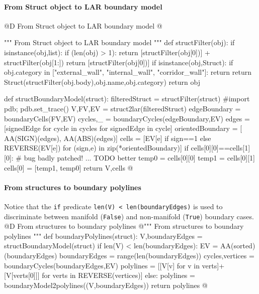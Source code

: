 \documentclass[11pt,oneside]{article}	%
\begin{document}
\paragraph{From Struct object to LAR boundary model}
@D From Struct object to LAR boundary model
@{""" From Struct object to LAR boundary model """
def structFilter(obj):
    if isinstance(obj,list):
        if (len(obj) > 1):
            return [structFilter(obj[0])] + structFilter(obj[1:])
        return [structFilter(obj[0])]
    if isinstance(obj,Struct):
        if obj.category in ["external_wall", "internal_wall", "corridor_wall"]:
            return
        return Struct(structFilter(obj.body),obj.name,obj.category)
    return obj

def structBoundaryModel(struct):
    filteredStruct = structFilter(struct)
    #import pdb; pdb.set_trace()
    V,FV,EV = struct2lar(filteredStruct)
    edgeBoundary = boundaryCells(FV,EV)
    cycles,_ = boundaryCycles(edgeBoundary,EV)
    edges = [signedEdge for cycle in cycles for signedEdge in cycle]
    orientedBoundary = [ AA(SIGN)(edges), AA(ABS)(edges)]
    cells = [EV[e] if sign==1 else REVERSE(EV[e]) for (sign,e) in zip(*orientedBoundary)]
    if cells[0][0]==cells[1][0]: # bug badly patched! ... TODO better
        temp0 = cells[0][0]
        temp1 = cells[0][1]
        cells[0] = [temp1, temp0]
    return V,cells
@}



\paragraph{From structures to boundary polylines}
Notice that the \texttt{if} predicate \texttt{len(V) < len(boundaryEdges)} 
is used to discriminate between manifold (\texttt{False}) and non-manifold (\texttt{True})
boundary cases.
@D From structures to boundary polylines
@{""" From structures to boundary polylines """
def boundaryPolylines(struct):
    V,boundaryEdges = structBoundaryModel(struct)
    if len(V) < len(boundaryEdges):
        EV = AA(sorted)(boundaryEdges)
        boundaryEdges = range(len(boundaryEdges))
        cycles,vertices = boundaryCycles(boundaryEdges,EV)
        polylines = [[V[v] for v in verts]+[V[verts[0]]] for verts in REVERSE(vertices)]
    else:
        polylines = boundaryModel2polylines((V,boundaryEdges))
    return polylines
@}
\end{document}
